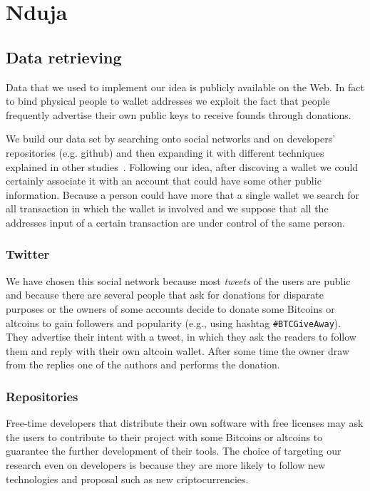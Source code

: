 \section{Nduja}

\subsection{Data retrieving}
Data that we used to implement our idea is publicly available on the Web. In
fact to bind physical people to wallet addresses we exploit the fact that
people frequently advertise their own public keys to receive founds
through donations.

We build our data set by searching onto social networks and on developers'
repositories (e.g. github) and then expanding it with different techniques
explained in other studies~\cite{fistful}. Following our idea, after discoving
a wallet we could certainly associate it with an account that could have some
other public information. Because a person could have more that a single wallet
we search for all transaction in which the wallet is involved and we suppose
that all the addresses input of a certain transaction are under control of the
same person.

\subsubsection*{Twitter}
We have chosen this social network because most \textit{tweets} of the users are
public and because there are several people that ask for donations 
for disparate purposes or the owners of some accounts decide to donate some
Bitcoins or altcoins to gain followers and popularity (e.g., using hashtag
\texttt{\#BTCGiveAway}). They advertise their intent with a tweet, in which
they ask the readers to follow them and reply with their own altcoin wallet.
After some time the owner draw from the replies one of the authors and performs
the donation.

\subsubsection*{Repositories}
Free-time developers that distribute their own software with free licenses may
ask the users to contribute to their project with some Bitcoins or altcoins to
guarantee the further development of their tools. The choice of targeting our
research even on developers is because they are more likely to follow new
technologies and proposal such as new criptocurrencies.

